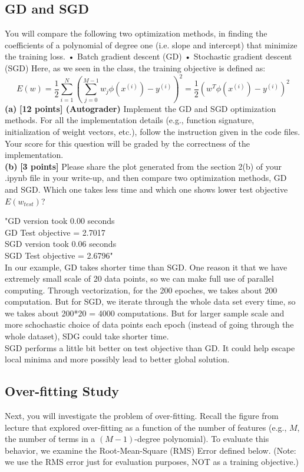 \documentclass[lang=cn,11pt]{elegantbook}
\begin{document}
\subsection{GD and SGD}
You will compare the following two optimization methods, in finding the coefficients of a polynomial of degree one (i.e. slope and intercept) that minimize the training loss.
• Batch gradient descent (GD)
• Stochastic gradient descent (SGD)
Here, as we seen in the class, the training objective is defined as:
$$
E(w) = \frac{1}{2} \sum_{i=1}^N (\sum_{j=0}^{M-1}w_j \phi(x^{(i)})- y^{(i)})^2  = \frac{1}{2} (w^T\phi(x^{(i)}) - y^{(i)})^2
$$
\noindent \textbf{(a) }\textbf{[12 points] (Autograder)} Implement the GD and SGD optimization methods. For all the implementation details (e.g., function signature, initialization of weight vectors, etc.), follow the instruction given in the code files. Your score for this question will be graded by the correctness of the implementation.\\
\noindent \textbf{(b) }\textbf{[3 points]} Please share the plot generated from the section 2(b) of your .ipynb file in your write-up, and then compare two optimization methods, GD and SGD. Which one takes less time and which one shows lower test objective $E(w_{test})$?
\begin{solution}
"GD version took 0.00 seconds\\
GD Test objective = 2.7017\\
SGD version took 0.06 seconds\\
SGD Test objective = 2.6796"\\
In our example, GD takes shorter time than SGD. One reason it that we have extremely small scale of 20 data points, so we can make full use of parallel computing. Through vectorization, for the 200 epoches, we takes about 200 computation. But for SGD, we iterate through the whole data set every time, so we takes about 200*20 = 4000 computations. But for larger sample scale and more schochastic choice of data points each epoch (instead of going through the whole dataset), SDG could take shorter time.\\
SGD performs a little bit better on test objective than GD. It could help escape local minima and more possibly lead to better global solution.
\end{solution}

\subsection{Over-fitting Study}
Next, you will investigate the problem of over-fitting. Recall the figure from lecture that explored over-fitting as a function of the number of features (e.g., \( M \), the number of terms in a \((M - 1)\)-degree polynomial). To evaluate this behavior, we examine the Root-Mean-Square (RMS) Error defined below. (Note: we use the RMS error just for evaluation purposes, NOT as a training objective.)
\end{document}
